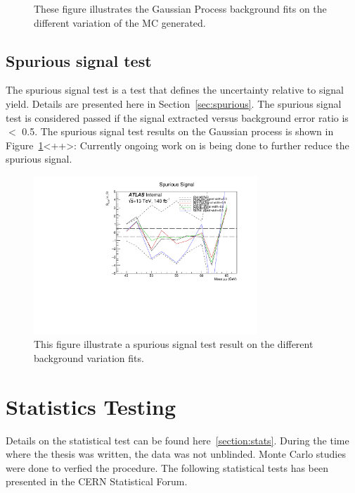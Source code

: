 \begin{figure}[!htb]
\begin{center}
        \caption{
        These figure illustrates the Gaussian Process background fits on the different variation of the MC generated. }
    \end{center}
\end{figure}

\subsection{Spurious signal test}

The spurious signal test is a test that defines the uncertainty relative to signal yield. Details are presented here in Section~\ref{sec:spurious}.
The spurious signal test is considered passed if the signal extracted versus background error ratio is $<$ 0.5.
The spurious signal test results on the Gaussian process is shown in Figure~\ref{fig:spurious}<++>:
Currently ongoing work on is being done to further reduce the spurious signal.

\begin{figure}[!htb]
    \begin{center}
        \includegraphics[width=0.75\textwidth]{figures/chapter_dimuon/spurious}        
        \caption{
        This figure illustrate a spurious signal test result on the different background variation fits.}
        \label{fig:spurious}
    \end{center}
\end{figure}

\section{Statistics Testing}
Details on the statistical test can be found here~\ref{section:stats}. During the time where the thesis was written, the data was not unblinded. Monte Carlo studies were done to verfied the procedure. The following statistical tests has been presented in the CERN Statistical Forum.

